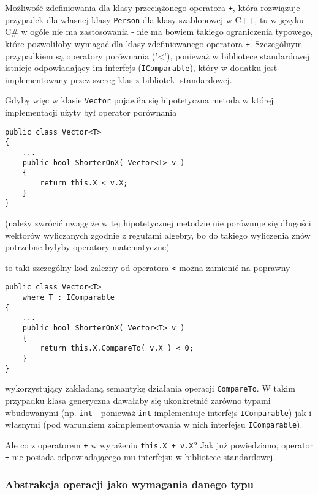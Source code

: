 Możliwość zdefiniowania dla klasy przeciążonego operatora {\tt +}, która rozwiązuje przypadek dla własnej klasy 
{\tt Person} dla klasy szablonowej w C++, tu w języku C\# w ogóle nie ma zastosowania - nie ma bowiem takiego
ograniczenia typowego, które pozwoliłoby wymagać dla klasy zdefiniowanego operatora {\tt +}. Szczególnym przypadkiem
są operatory porównania ('<'), ponieważ w bibliotece standardowej istnieje odpowiadający im interfejs ({\tt IComparable}), 
który w dodatku jest implementowany przez szereg klas z biblioteki standardowej.

Gdyby więc w klasie {\tt Vector} pojawiła się hipotetyczna metoda w której implementacji użyty był operator porównania

\begin{scriptsize}
\begin{verbatim}
public class Vector<T>
{
    ...
    public bool ShorterOnX( Vector<T> v )
    {
        return this.X < v.X;
    }    
}
\end{verbatim}
\end{scriptsize}

(należy zwrócić uwagę że w tej hipotetycznej metodzie nie porównuje się długości wektorów wyliczanych
zgodnie z regułami algebry, bo do takiego wyliczenia znów potrzebne byłyby operatory matematyczne)

to taki szczególny kod zależny od operatora {\tt <} można zamienić na poprawny

\begin{scriptsize}
\begin{verbatim}
public class Vector<T>
    where T : IComparable
{
    ...
    public bool ShorterOnX( Vector<T> v )
    {
        return this.X.CompareTo( v.X ) < 0;
    }    
}
\end{verbatim}
\end{scriptsize}

wykorzystujący zakładaną semantykę działania operacji {\tt CompareTo}. W takim przypadku klasa generyczna
dawałaby się ukonkretnić zarówno typami wbudowanymi (np. {\tt int} - ponieważ {\tt int} implementuje interfejs
{\tt IComparable}) jak i własnymi (pod warunkiem zaimplementowania w nich interfejsu {\tt IComparable}).

Ale co z operatorem {\tt +} w wyrażeniu {\tt this.X + v.X}? Jak już powiedziano, operator {\tt +} 
nie posiada odpowiadającego mu interfejsu w bibliotece standardowej.

\subsubsection{Abstrakcja operacji jako wymagania danego typu}

